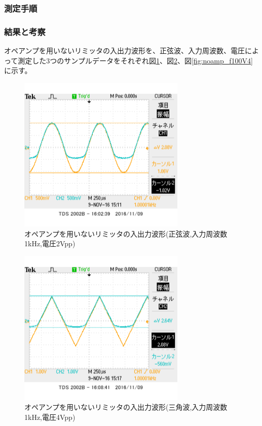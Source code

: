 \documentclass[11pt,a4j]{jsarticle}
\begin{document}
   \subsubsection{測定手順}
    
    
   \subsubsection{結果と考察}
    
    オペアンプを用いないリミッタの入出力波形を、正弦波、入力周波数、電圧によって測定した3つのサンプルデータをそれぞれ図\ref{fig:noamp_f1V2}、図\ref{fig:noamp_sankaku}、図\ref{fig:noamp_f100V4}に示す。
    
    
    \begin{figure}[htbp]
  \centering
  \includegraphics[width=8cm,clip]{1_1_noampFG_f1V2_ViVo.png}
  \caption{オペアンプを用いないリミッタの入出力波形(正弦波,入力周波数1kHz,電圧2Vpp)}
  \label{fig:noamp_f1V2}
 \end{figure}%
 
 \begin{figure}[htbp]
  \centering
  \includegraphics[width=8cm,clip]{1_1_noampFG_f1V4sankaku_ViVo.png}
  \caption{オペアンプを用いないリミッタの入出力波形(三角波,入力周波数1kHz,電圧4Vpp)}
  \label{fig:noamp_sankaku}
 \end{figure}%
 
\end{document}
